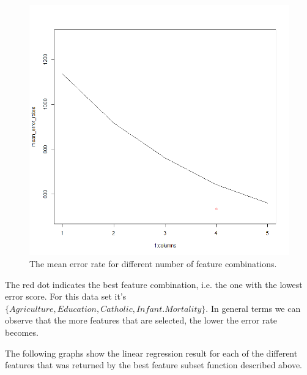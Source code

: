 \documentclass[a4paper,12pt]{article}
\begin{document}
\begin{figure}[H]
\centering
\begin{minipage}[]{0.5\textwidth}
  \includegraphics[width=\textwidth]{figures/Lab2A1_me_features.png}  
  \caption{The mean error rate for different number of feature combinations.\label{fig:features} }
 \end{minipage}
\end{figure}

The red dot indicates the best feature combination, i.e. the one with the lowest error score. For this data set it's \( \{Agriculture, Education, Catholic, Infant.Mortality\} \). In general terms we can observe that the more features that are selected, the lower the error rate becomes.

The following graphs show the linear regression result for each of the different features that was returned by the best feature subset function described above.
\end{document}
